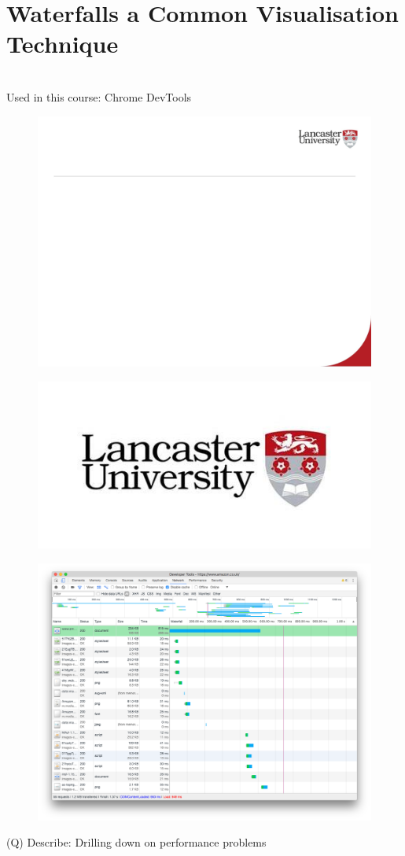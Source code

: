 \documentclass[12pt]{article}
\begin{document}
\section{Waterfalls a Common Visualisation Technique}
\\
Used in this course: Chrome DevTools\\
\begin{figure}[H]
\includegraphics[width=0.5\linewidth]{page41-image-1.png}
\end{figure}
\begin{figure}[H]
\includegraphics[width=0.5\linewidth]{page41-image-2.png}
\end{figure}
\begin{figure}[H]
\includegraphics[width=0.5\linewidth]{page41-image-3.png}
\end{figure}
\clearpage
(Q)
Describe: Drilling down on performance problems
\clearpage
\end{document}
